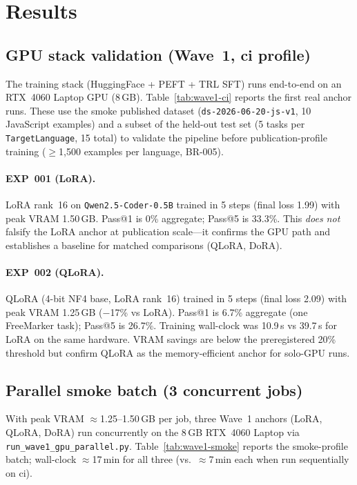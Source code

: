 \section{Results}

\subsection{GPU stack validation (Wave~1, ci profile)}

The training stack (HuggingFace + PEFT + TRL SFT) runs end-to-end on an RTX~4060 Laptop GPU (8\,GB).
Table~\ref{tab:wave1-ci} reports the first real anchor runs.
These use the smoke published dataset (\texttt{ds-2026-06-20-js-v1}, 10 JavaScript examples) and a
subset of the held-out test set (5 tasks per \texttt{TargetLanguage}, 15 total) to validate the
pipeline before publication-profile training ($\geq$1{,}500 examples per language, BR-005).



\paragraph{EXP~001 (LoRA).}
LoRA rank~16 on \texttt{Qwen2.5-Coder-0.5B} trained in 5 steps (final loss 1.99) with peak VRAM
1.50\,GB.
Pass@1 is 0\% aggregate; Pass@5 is 33.3\%.
This \emph{does not} falsify the LoRA anchor at publication scale---it confirms the GPU path and
establishes a baseline for matched comparisons (QLoRA, DoRA).

\paragraph{EXP~002 (QLoRA).}
QLoRA (4-bit NF4 base, LoRA rank~16) trained in 5 steps (final loss 2.09) with peak VRAM
1.25\,GB ($-$17\% vs LoRA).
Pass@1 is 6.7\% aggregate (one FreeMarker task); Pass@5 is 26.7\%.
Training wall-clock was 10.9\,s vs 39.7\,s for LoRA on the same hardware.
VRAM savings are below the preregistered 20\% threshold but confirm QLoRA as the memory-efficient
anchor for solo-GPU runs.

\subsection{Parallel smoke batch (3 concurrent jobs)}

With peak VRAM $\approx$1.25--1.50\,GB per job, three Wave~1 anchors (LoRA, QLoRA, DoRA) run
concurrently on the 8\,GB RTX~4060 Laptop via \texttt{run\_wave1\_gpu\_parallel.py}.
Table~\ref{tab:wave1-smoke} reports the smoke-profile batch; wall-clock $\approx$17\,min for all three
(vs.\ $\approx$7\,min each when run sequentially on ci).

